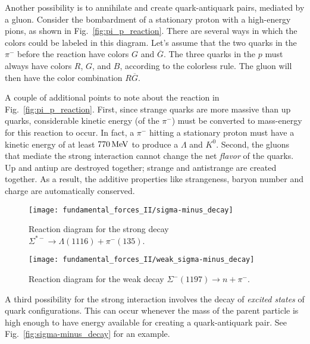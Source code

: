 Another possibility is to annihilate and create quark-antiquark pairs,
mediated by a gluon.  Consider the bombardment of a stationary proton
with a high-energy pions, as shown in Fig.~\ref{fig:pi_p_reaction}.
There are several ways in which the colors could be labeled in this
diagram.  Let's assume that the two quarks in the $\pi^-$ before the
reaction have colors $G$ and $\overline G$.  The three quarks in the
$p$ must always have colors $R$, $G$, and $B$, according to the
colorless rule.  The gluon will then have the color combination
$R\overline G$.

A couple of additional points to note about the reaction in
Fig.~\ref{fig:pi_p_reaction}. First, since strange quarks are more
massive than up quarks, considerable kinetic energy (of the $\pi^-$)
must be converted to mass-energy for this reaction to occur.  In fact,
a $\pi^-$ hitting a stationary proton must have a kinetic energy of at
least $770\,\mbox{MeV}$ to produce a $\Lambda$ and $K^0$.  Second, the gluons
that mediate the strong interaction cannot change the net {\em flavor}
of the quarks.  Up and antiup are destroyed together; strange and
antistrange are created together.  As a result, the additive
properties like strange\-ness, baryon number and charge are
automatically conserved.

\begin{figure}[tbp]
\begin{minipage}{6cm}
\begin{center}
\texttt{[image: fundamental\_forces\_II/sigma-minus\_decay]}
\caption{Reaction diagram for the strong decay $\Sigma^{\ast -} \to
  \Lambda(1116) + \pi^-(135)$.}
\label{fig:sigma-minus_decay}
\end{center}
\end{minipage}
\hfill
\begin{minipage}{6cm}
\begin{center}
\texttt{[image: fundamental\_forces\_II/weak\_sigma-minus\_decay]}
\caption{Reaction diagram for the weak decay $\Sigma^-(1197) \to n +
  \pi^-$.}
\label{fig:weak_sigma-minus_decay}
\end{center}
\end{minipage}
\end{figure}


A third possibility for the strong interaction involves the decay of
{\em excited states} of quark configurations.  This can occur whenever
the mass of the parent particle is high enough to have energy
available for creating a quark-antiquark pair.  See
Fig.~\ref{fig:sigma-minus_decay} for an example.

